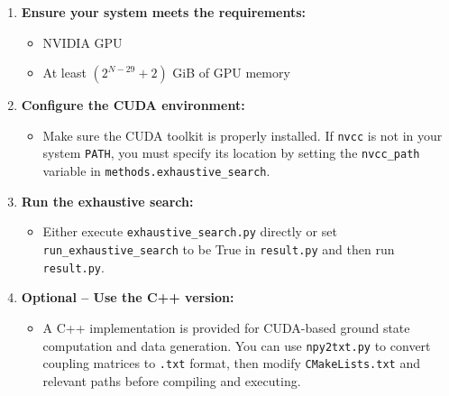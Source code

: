 \documentclass{article}
\begin{document}
\begin{enumerate}
    \item \textbf{Ensure your system meets the requirements:}
    \begin{itemize}
        \item NVIDIA GPU
        \item At least $\left(2^{N-29} + 2\right)$ GiB of GPU memory
    \end{itemize}
    
    \item \textbf{Configure the CUDA environment:}
    \begin{itemize}
        \item Make sure the CUDA toolkit is properly installed. If \texttt{nvcc} is not in your system \texttt{PATH}, you must specify its location by setting the \texttt{nvcc\_path} variable in \texttt{methods.exhaustive\_search}.
    \end{itemize}
    
    \item \textbf{Run the exhaustive search:}
    \begin{itemize}
        \item Either execute \texttt{exhaustive\_search.py} directly or set \texttt{run\_exhaustive\_search} to be True in \texttt{result.py} and then run \texttt{result.py}.
    \end{itemize}
    
    \item \textbf{Optional – Use the C++ version:}
    \begin{itemize}
        \item A C++ implementation is provided for CUDA-based ground state computation and data generation. You can use \texttt{npy2txt.py} to convert coupling matrices to \texttt{.txt} format, then modify \texttt{CMakeLists.txt} and relevant paths before compiling and executing.
    \end{itemize}
\end{enumerate}
\end{document}
